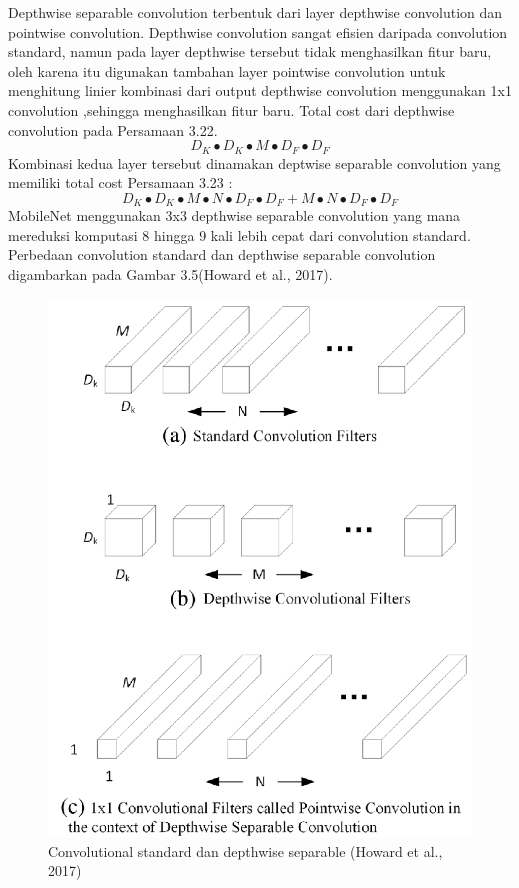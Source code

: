 Depthwise separable convolution terbentuk dari layer depthwise convolution dan pointwise convolution. Depthwise convolution sangat efisien daripada convolution standard, namun pada layer depthwise tersebut tidak menghasilkan fitur baru, oleh karena itu digunakan tambahan layer pointwise convolution untuk menghitung linier kombinasi dari output depthwise convolution menggunakan 1x1 convolution ,sehingga menghasilkan fitur baru. Total cost dari depthwise convolution pada Persamaan 3.22.
\begin{equation}
D_K \bullet D_K \bullet M \bullet D_F \bullet D_F
\end{equation}
Kombinasi kedua layer tersebut dinamakan deptwise separable convolution yang memiliki total cost Persamaan 3.23 :
\begin{equation}
D_K \bullet D_K \bullet M \bullet N \bullet D_F \bullet D_F + M \bullet N \bullet D_F \bullet D_F
\end{equation}
MobileNet menggunakan 3x3 depthwise separable convolution yang mana mereduksi komputasi 8 hingga 9 kali lebih cepat dari convolution standard. Perbedaan convolution standard dan depthwise separable convolution digambarkan pada Gambar 3.5(Howard et al., 2017).
\begin{figure}[H]
	\centering
	\includegraphics[width=0.5\linewidth]{"new"}
	\caption{Convolutional standard dan depthwise separable (Howard et al., 2017)}
	\label{fig:new}
\end{figure} 
